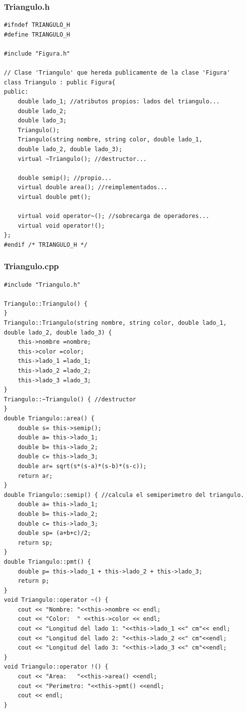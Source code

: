 \documentclass[11pt]{article}
\begin{document}
\subsubsection*{Triangulo.h}
\begin{lstlisting}
#ifndef TRIANGULO_H
#define TRIANGULO_H
	
#include "Figura.h"
	
// Clase 'Triangulo' que hereda publicamente de la clase 'Figura'
class Triangulo : public Figura{	
public:
	double lado_1; //atributos propios: lados del triangulo...
	double lado_2;
	double lado_3;
	Triangulo();
	Triangulo(string nombre, string color, double lado_1, 
	double lado_2, double lado_3);
	virtual ~Triangulo(); //destructor...
	
	double semip(); //propio...
	virtual double area(); //reimplementados...
	virtual double pmt();
		
	virtual void operator~(); //sobrecarga de operadores...
	virtual void operator!();
};
#endif /* TRIANGULO_H */
\end{lstlisting}
\vspace{1 em}
\subsubsection*{Triangulo.cpp}
\begin{lstlisting}
#include "Triangulo.h"

Triangulo::Triangulo() {		
}
Triangulo::Triangulo(string nombre, string color, double lado_1,
double lado_2, double lado_3) {
	this->nombre =nombre;
	this->color =color;
	this->lado_1 =lado_1;
	this->lado_2 =lado_2;
	this->lado_3 =lado_3;		
}
Triangulo::~Triangulo() { //destructor
}
double Triangulo::area() {
	double s= this->semip();
	double a= this->lado_1;
	double b= this->lado_2;
	double c= this->lado_3;
	double ar= sqrt(s*(s-a)*(s-b)*(s-c));
	return ar;
} 
double Triangulo::semip() { //calcula el semiperimetro del triangulo.
	double a= this->lado_1;
	double b= this->lado_2;
	double c= this->lado_3;
	double sp= (a+b+c)/2;
	return sp;
}
double Triangulo::pmt() {
	double p= this->lado_1 + this->lado_2 + this->lado_3;
	return p;
}
void Triangulo::operator ~() {
	cout << "Nombre: "<<this->nombre << endl;
	cout << "Color:  " <<this->color << endl;
	cout << "Longitud del lado 1: "<<this->lado_1 <<" cm"<< endl;
	cout << "Longitud del lado 2: "<<this->lado_2 <<" cm"<<endl;
	cout << "Longitud del lado 3: "<<this->lado_3 <<" cm"<<endl;
}
void Triangulo::operator !() {    
	cout << "Area:   "<<this->area() <<endl;
	cout << "Perimetro: "<<this->pmt() <<endl;
	cout << endl;	
}
\end{lstlisting}
\vspace{2 em}
\end{document}
